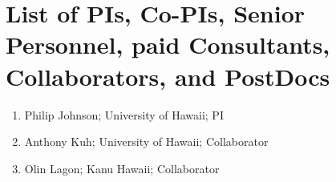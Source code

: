 
\section*{List of PIs, Co-PIs, Senior Personnel, paid Consultants,
  Collaborators, and PostDocs}


\begin{enumerate}
\item Philip Johnson; University of Hawaii; PI
\item Anthony Kuh; University of Hawaii; Collaborator
\item Olin Lagon; Kanu Hawaii; Collaborator
\end{enumerate}



